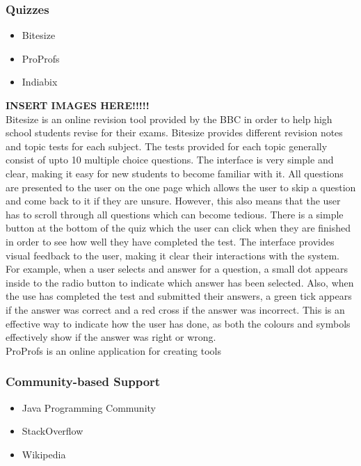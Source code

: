 \documentclass{article}
\begin{document}
\subsubsection{Quizzes}

\begin{itemize}
\item Bitesize
\item ProProfs
\item Indiabix
\end{itemize}

\textbf{INSERT IMAGES HERE!!!!!}\\

Bitesize is an online revision tool provided by the BBC in order to help high school students revise for their exams. Bitesize provides different revision notes and topic tests for each subject. The tests provided for each topic generally consist of upto 10 multiple choice questions. The interface is very simple and clear, making it easy for new students to become familiar with it. All questions are presented to the user on the one page which allows the user to skip a question and come back to it if they are unsure. However, this also means that the user has to scroll through all questions which can become tedious. There is a simple button at the bottom of the quiz which the user can click when they are finished in order to see how well they have completed the test. The interface provides visual feedback to the user, making it clear their interactions with the system. For example, when a user selects and answer for a question, a small dot appears inside to the radio button to indicate which answer has been selected. Also, when the use has completed the test and submitted their answers, a green tick appears if the answer was correct and a red cross if the answer was incorrect. This is an effective way to indicate how the user has done, as both the colours and symbols effectively show if the answer was right or wrong.\\

ProProfs is an online application for creating tools 


\subsubsection{Community-based Support}

\begin{itemize}
\item Java Programming Community
\item StackOverflow
\item Wikipedia
\end{itemize}
\end{document}
